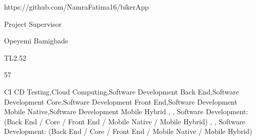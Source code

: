 {https://github.com/NamraFatima16/bikerApp}

{Project Supervisor}

{}

{Opeyemi Bamigbade}

{TL2.52}

{57}

{CI CD Testing,Cloud Computing,Software Development Back End,Software Development Core,Software Development Front End,Software Development Mobile Native,Software Development Mobile Hybrid}
{, , Software Development: (Back End / Core / Front End / Mobile Native / Mobile Hybrid)}
{, , Software Development: (Back End / Core / Front End / Mobile Native / Mobile Hybrid)}

\endgroup

\DefaultLayout
